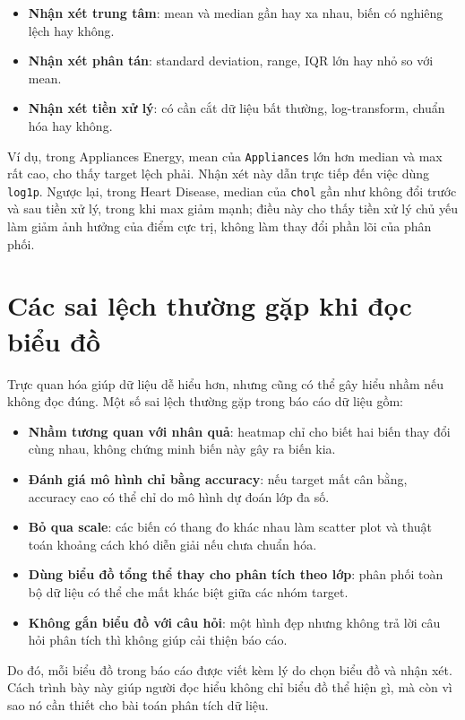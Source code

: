 \begin{itemize}[leftmargin=1.6em,label=\textbullet]
 \item \textbf{Nhận xét trung tâm}: mean và median gần hay xa nhau, biến có nghiêng lệch hay không.
 \item \textbf{Nhận xét phân tán}: standard deviation, range, IQR lớn hay nhỏ so với mean.
 \item \textbf{Nhận xét tiền xử lý}: có cần cắt dữ liệu bất thường, log-transform, chuẩn hóa hay không.
\end{itemize}

Ví dụ, trong Appliances Energy, mean của \texttt{Appliances} lớn hơn median và max rất cao, cho thấy target lệch phải. Nhận xét này dẫn trực tiếp đến việc dùng \texttt{log1p}. Ngược lại, trong Heart Disease, median của \texttt{chol} gần như không đổi trước và sau tiền xử lý, trong khi max giảm mạnh; điều này cho thấy tiền xử lý chủ yếu làm giảm ảnh hưởng của điểm cực trị, không làm thay đổi phần lõi của phân phối.

\section{Các sai lệch thường gặp khi đọc biểu đồ}

Trực quan hóa giúp dữ liệu dễ hiểu hơn, nhưng cũng có thể gây hiểu nhầm nếu không đọc đúng. Một số sai lệch thường gặp trong báo cáo dữ liệu gồm:

\begin{itemize}[leftmargin=1.6em,label=\textbullet]
 \item \textbf{Nhầm tương quan với nhân quả}: heatmap chỉ cho biết hai biến thay đổi cùng nhau, không chứng minh biến này gây ra biến kia.
 \item \textbf{Đánh giá mô hình chỉ bằng accuracy}: nếu target mất cân bằng, accuracy cao có thể chỉ do mô hình dự đoán lớp đa số.
 \item \textbf{Bỏ qua scale}: các biến có thang đo khác nhau làm scatter plot và thuật toán khoảng cách khó diễn giải nếu chưa chuẩn hóa.
 \item \textbf{Dùng biểu đồ tổng thể thay cho phân tích theo lớp}: phân phối toàn bộ dữ liệu có thể che mất khác biệt giữa các nhóm target.
 \item \textbf{Không gắn biểu đồ với câu hỏi}: một hình đẹp nhưng không trả lời câu hỏi phân tích thì không giúp cải thiện báo cáo.
\end{itemize}

Do đó, mỗi biểu đồ trong báo cáo được viết kèm lý do chọn biểu đồ và nhận xét. Cách trình bày này giúp người đọc hiểu không chỉ biểu đồ thể hiện gì, mà còn vì sao nó cần thiết cho bài toán phân tích dữ liệu.

